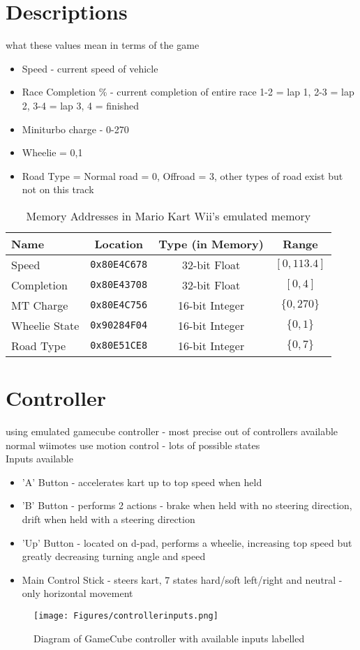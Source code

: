 \section{Descriptions}
what these values mean in terms of the game
\begin{itemize}
    \item Speed - current speed of vehicle
    \item Race Completion \% - current completion of entire race 1-2 = lap 1, 2-3 = lap 2, 3-4 = lap 3, 4 = finished
    \item Miniturbo charge - 0-270
    \item Wheelie = 0,1
    \item Road Type = Normal road = 0, Offroad = 3, other types of road exist but not on this track
\end{itemize}
\begin{table}[h]
    \centering
    \begin{tabular}{l|c|c|c}
    \textbf{Name}  & \textbf{Location} & \textbf{Type (in Memory)} & \textbf{Range}\\
    \hline
     Speed  &        \texttt{0x80E4C678} & 32-bit Float  & $$[0, 113.4]$$\\
     Completion  &   \texttt{0x80E43708} & 32-bit Float  & $$[0, 4] $$\\
     MT Charge &     \texttt{0x80E4C756} & 16-bit Integer& $$\{0,270\}$$\\
     Wheelie State & \texttt{0x90284F04} & 16-bit Integer& $$\{0,1\}$$\\
     Road Type &     \texttt{0x80E51CE8} & 16-bit Integer& $$ \{0,7\} $$\\
    \end{tabular}
    \caption{Memory Addresses in Mario Kart Wii's emulated memory}
    \label{tab:memory-addresses}
\end{table}
\section{Controller}
using emulated gamecube controller - most precise out of controllers available \\
normal wiimotes use motion control - lots of possible states\\
Inputs available
\begin{itemize}
    \item 'A' Button - accelerates kart up to top speed when held
    \item 'B' Button - performs 2 actions - brake when held with no steering direction, drift when held with a steering direction
    \item 'Up' Button - located on d-pad, performs a wheelie, increasing top speed but greatly decreasing turning angle and speed
    \item Main Control Stick - steers kart, 7 states hard/soft left/right and neutral - only horizontal movement
\end{itemize}
\begin{figure}
    \centering
    \texttt{[image: Figures/controllerinputs.png]}
    \caption{Diagram of GameCube controller with available inputs labelled}
    \label{fig:laballed-gc-diagram}
\end{figure}
